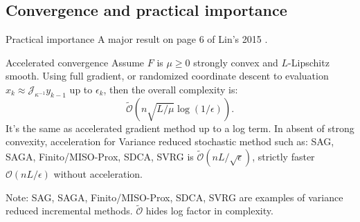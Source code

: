 \documentclass[11pt]{beamer}
\begin{document}
        \subsection{Convergence and practical importance}
            \begin{frame}{Practical importance}
                A major result on page 6 of Lin's 2015 \cite{lin_universal_2015}. 
                \begin{block}{Accelerated convergence}
                    Assume $F$ is $\mu\ge 0$ strongly convex and $L$-Lipschitz smooth. 
                    Using full gradient, or randomized coordinate descent to evaluation $x_k \approx \mathcal J_{\kappa^{-1}}y_{k - 1}$ up to $\epsilon_k$, then the overall complexity is:
                    $$
                        \widetilde{\mathcal O}\left(n \sqrt{L/\mu} \log(1/\epsilon)\right). 
                    $$
                    It's the same as accelerated gradient method up to a log term. 
                    In absent of strong convexity, acceleration for Variance reduced stochastic method such as: SAG, SAGA, Finito/MISO-Prox, SDCA, SVRG is $\widetilde {\mathcal O}(n L/\sqrt{\epsilon})$, strictly faster $\mathcal O(nL/\epsilon)$ without acceleration. 
                \end{block}
                Note: SAG, SAGA, Finito/MISO-Prox, SDCA, SVRG are examples of variance reduced incremental methods. 
                $\widetilde {\mathcal O}$ hides log factor in complexity. 
            \end{frame}
\end{document}
